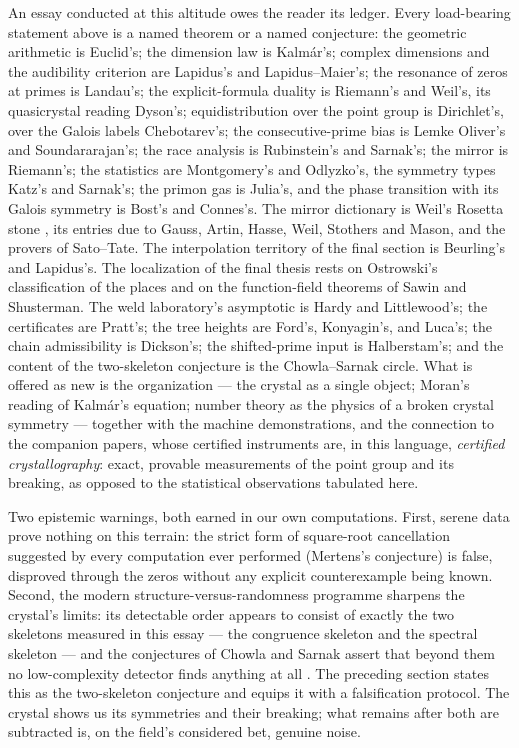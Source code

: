 \documentclass[11pt]{article}
\theoremstyle{remark}
\begin{document}
An essay conducted at this altitude owes the reader its ledger. Every load-bearing statement above is
a named theorem or a named conjecture: the geometric arithmetic is Euclid's; the dimension law is
Kalm\'ar's; complex dimensions and the audibility criterion are Lapidus's and Lapidus--Maier's; the
resonance of zeros at primes is Landau's; the explicit-formula duality is Riemann's and Weil's, its
quasicrystal reading Dyson's; equidistribution over the point group is Dirichlet's, over the Galois
labels Chebotarev's; the consecutive-prime bias is Lemke Oliver's and Soundararajan's; the race
analysis is Rubinstein's and Sarnak's; the mirror is Riemann's; the statistics are Montgomery's and
Odlyzko's, the symmetry types Katz's and Sarnak's; the primon gas is Julia's, and the phase
transition with its Galois symmetry is Bost's and Connes's. The mirror dictionary is Weil's
Rosetta stone \cite{Krieger}, its entries due to Gauss, Artin, Hasse, Weil, Stothers and Mason, and
the provers of Sato--Tate. The interpolation
territory of the final section is Beurling's and Lapidus's. The localization of the final thesis rests on Ostrowski's classification of the places and on the
function-field theorems of Sawin and Shusterman. The weld laboratory's asymptotic is Hardy and Littlewood's; the certificates are Pratt's; the
tree heights are Ford's, Konyagin's, and Luca's; the chain admissibility is Dickson's; the
shifted-prime input is Halberstam's; and the content of the two-skeleton conjecture is the
Chowla--Sarnak circle. What is offered as new is the organization --- the
crystal as a single object; Moran's reading of Kalm\'ar's equation; number theory as the physics of a
broken crystal symmetry --- together with the machine demonstrations, and the connection to the
companion papers, whose certified instruments \cite{CompanionII, CompanionIII} are, in this
language, \emph{certified crystallography}: exact, provable measurements of the point group and its
breaking, as opposed to the statistical observations tabulated here.

Two epistemic warnings, both earned in our own computations. First, serene data prove nothing on this
terrain: the strict form of square-root cancellation suggested by every computation ever performed
(Mertens's conjecture) is false, disproved through the zeros without any explicit counterexample
being known. Second, the modern structure-versus-randomness programme sharpens the crystal's
limits: its detectable order appears to consist of exactly the two skeletons measured in this essay
--- the congruence skeleton and the spectral skeleton --- and the conjectures of Chowla and Sarnak
assert that beyond them no low-complexity detector finds anything at all \cite{Sarnak}. The preceding
section states this as the two-skeleton conjecture and equips it with a falsification protocol. The crystal
shows us its symmetries and their breaking; what remains after both are subtracted is, on the field's
considered bet, genuine noise.
\end{document}
